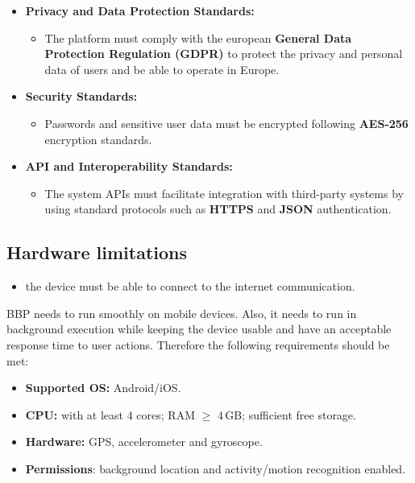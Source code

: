 \documentclass{Configuration_Files/PoliMi3i_thesis}
\begin{document}
\begin{itemize}
    \item \textbf{Privacy and Data Protection Standards:}
    \begin{itemize}
        \item The platform must comply with the european \textbf{General Data Protection Regulation (GDPR)} to protect the privacy and personal data of users and be able to operate in Europe.
    \end{itemize}

    \item \textbf{Security Standards:}
    \begin{itemize}
        \item Passwords and sensitive user data must be encrypted following \textbf{AES-256} encryption standards.
    \end{itemize}

    \item \textbf{API and Interoperability Standards:}
    \begin{itemize}
        \item The system APIs must facilitate integration with third-party systems by using standard protocols such as \textbf{HTTPS} and \textbf{JSON} authentication.
    \end{itemize}
\end{itemize}


\subsection{Hardware limitations}
\begin{itemize}
\item the device must be able to connect to the internet communication.
\end{itemize}

BBP needs to run smoothly on mobile devices. Also, it needs to run in background execution while keeping the device usable and have an acceptable response time to user actions. Therefore the following requirements should be met: 

\begin{itemize}
  \item \textbf{Supported OS:} Android/iOS.
  \item \textbf{CPU:} with at least 4 cores; RAM $\geq$ 4\,GB; sufficient free storage.
  \item \textbf{Hardware:} GPS, accelerometer and gyroscope.
  \item \textbf{Permissions}: background location and activity/motion recognition enabled.
\end{itemize}
\end{document}
